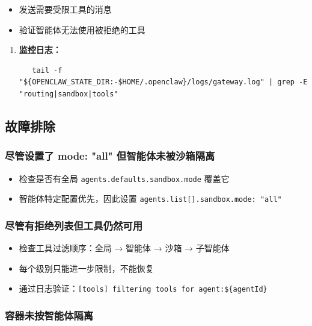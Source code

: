 \begin{itemize}
  \item 发送需要受限工具的消息
  \item 验证智能体无法使用被拒绝的工具
\end{itemize}


\begin{enumerate}
  \item \textbf{监控日志：}
\begin{lstlisting}
   tail -f "${OPENCLAW_STATE_DIR:-$HOME/.openclaw}/logs/gateway.log" | grep -E "routing|sandbox|tools"
\end{lstlisting}

\end{enumerate}


\hrulefill


\subsection{故障排除}


\subsubsection{尽管设置了 mode: "all" 但智能体未被沙箱隔离}


\begin{itemize}
  \item 检查是否有全局 \texttt{agents.defaults.sandbox.mode} 覆盖它
  \item 智能体特定配置优先，因此设置 \texttt{agents.list[].sandbox.mode: "all"}
\end{itemize}


\subsubsection{尽管有拒绝列表但工具仍然可用}


\begin{itemize}
  \item 检查工具过滤顺序：全局 → 智能体 → 沙箱 → 子智能体
  \item 每个级别只能进一步限制，不能恢复
  \item 通过日志验证：\texttt{[tools] filtering tools for agent:\$\{agentId\}}
\end{itemize}


\subsubsection{容器未按智能体隔离}


